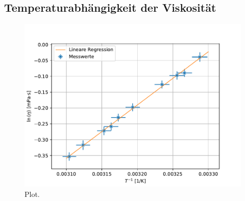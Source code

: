\subsection{Temperaturabhängigkeit der Viskosität}
\begin{figure}
  \centering
  \includegraphics{plot.pdf}
  \caption{Plot.}
  \label{fig:plot}
\end{figure}

